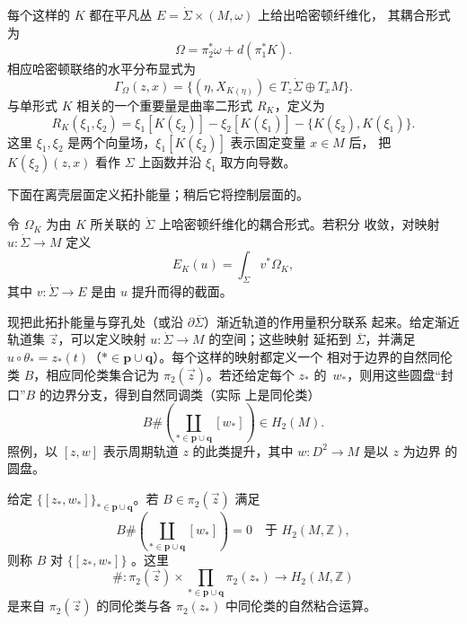 每个这样的 $K$ 都在平凡丛 $E=\dot\Sigma\times(M,\omega)$ 上给出哈密顿纤维化，
其耦合形式为
\[
 \Omega=\pi_2^*\omega+d(\pi_1^*K).
\]
相应哈密顿联络的水平分布显式为
\begin{equation}
 \Gamma_\Omega(z,x)=\{(\eta,X_{K(\eta)})\in T_z\dot\Sigma\oplus T_xM\}.
 \label{eq:20-horizontal-distribution}
\end{equation}
与单形式 $K$ 相关的一个重要量是曲率二形式 $R_K$，定义为
\begin{equation}
 R_K(\xi_1,\xi_2)=\xi_1[K(\xi_2)]-\xi_2[K(\xi_1)]
 -\{K(\xi_2),K(\xi_1)\}.
 \label{eq:20-curvature-form}
\end{equation}
这里 $\xi_1,\xi_2$ 是两个向量场，$\xi_1[K(\xi_2)]$ 表示固定变量 $x\in M$ 后，
把 $K(\xi_2)(z,x)$ 看作 $\Sigma$ 上函数并沿 $\xi_1$ 取方向导数。

下面在离壳层面定义拓扑能量；稍后它将控制\termOnShell{}层面的\termGeometricEnergy{}。

\begin{definition}[拓扑能量]
\label{def:20-topological-energy}
令 $\Omega_K$ 为由 $K$ 所关联的 $\dot\Sigma$ 上哈密顿纤维化的耦合形式。若积分
收敛，对映射 $u:\dot\Sigma\to M$ 定义
\[
 E_K(u)=\int_{\dot\Sigma}v^*\Omega_K,
\]
其中 $v:\dot\Sigma\to E$ 是由 $u$ 提升而得的截面。
\end{definition}

现把此拓扑能量与穿孔处（或沿 $\partial\overline\Sigma$）渐近轨道的作用量积分联系
起来。给定渐近轨道集 $\vec z$，可以定义映射 $u:\dot\Sigma\to M$ 的空间；这些映射
延拓到 $\overline\Sigma$，并满足
$u\circ\theta_*=z_*(t)$（$*\in\mathbf p\cup\mathbf q$）。每个这样的映射都定义一个
相对于边界的自然同伦类 $B$，相应同伦类集合记为 $\pi_2(\vec z)$。若还给定每个
$z_*$ 的\termBoundingDisc{}~$w_*$，则用这些圆盘“封口”$B$ 的边界分支，得到自然同调类（实际
上是同伦类）
\[
 B\#\left(\coprod_{*\in\mathbf p\cup\mathbf q}[w_*]\right)\in H_2(M).
\]
照例，以 $[z,w]$ 表示周期轨道 $z$ 的此类提升，其中 $w:D^2\to M$ 是以 $z$ 为边界
的圆盘。

\begin{definition}
\label{def:20-admissible-class}
给定 $\{[z_*,w_*]\}_{*\in\mathbf p\cup\mathbf q}$。若
$B\in\pi_2(\vec z)$ 满足
\begin{equation}
 B\#\left(\coprod_{*\in\mathbf p\cup\mathbf q}[w_*]\right)=0
 \quad\text{于 }H_2(M,\mathbb Z),
 \label{eq:20-admissible-capping}
\end{equation}
则称 $B$ 对 $\{[z_*,w_*]\}$ \termAdmissible{}。这里
\[
 \#: \pi_2(\vec z)\times
 \prod_{*\in\mathbf p\cup\mathbf q}\pi_2(z_*)\longrightarrow H_2(M,\mathbb Z)
\]
是来自 $\pi_2(\vec z)$ 的同伦类与各 $\pi_2(z_*)$ 中同伦类的自然粘合运算。
\end{definition}

